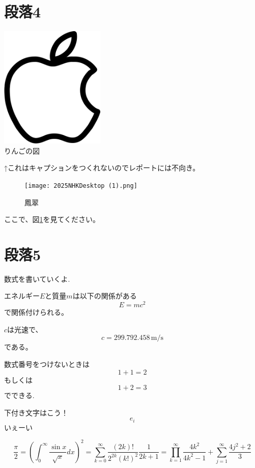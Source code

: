 \documentclass[a4paper,11pt]{jsarticle}
\begin{document}
\section{段落4}
\begin{center}
  \includegraphics[width=5cm]{apple.png}\\
  りんごの図
\end{center}
\par
↑これはキャプションをつくれないのでレポートには不向き。
\par
\begin{figure}
  \centering
  \texttt{[image: 2025NHKDesktop (1).png]}
  \caption{鳳翠}
  \label{鳳と翠}
\end{figure}
ここで、図\ref{鳳と翠}を見てください。
\par
\section{段落5}
数式を書いていくよ.
\par
エネルギー$E$と質量$m$は以下の関係がある
\begin{equation}
  E=mc^{2}
\end{equation}
で関係付けられる。
\par
$c$は光速で、
\begin{equation}
  \label{speed-of-light}
  c=299{.}792{.}458 \, \mathrm{m/s}
\end{equation}
である。
\par
数式番号をつけないときは
\[
  1+1=2
\]
もしくは
\begin{equation*}
  1+2=3
\end{equation*}
でできる.
\par
下付き文字はこう！
\begin{equation}
  e_{i}
\end{equation}
いぇーい
\par
\begin{equation}
  \frac{\pi}{2}=
  \left(\int_{0}^{\infty} \frac{\sin x}{\sqrt{x}} dx \right)^2=
  \sum_{k=0}^{\infty} \frac{(2k)!}{2^{2k}(k!)^2} \frac{1}{2k+1}=
  \prod_{k=1}^{\infty} \frac{4k^2}{4k^2-1}+
  \sum_{j=1}^{\infty} \frac{4j^2 + 2}{3}
\end{equation}
\end{document}
